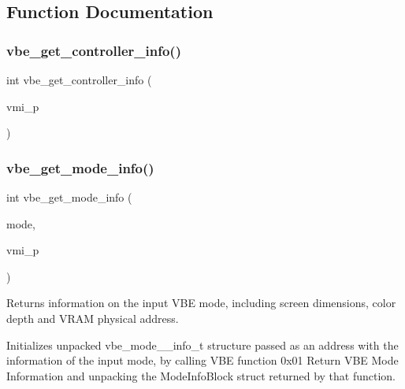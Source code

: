 \subsection{Function Documentation}
\mbox{\label{group__vbe_ga18c7989ffdce07149a4f948798afeca5}} 
\subsubsection{\texorpdfstring{vbe\+\_\+get\+\_\+controller\+\_\+info()}{vbe\_get\_controller\_info()}}
{\footnotesize\ttfamily int vbe\+\_\+get\+\_\+controller\+\_\+info (\begin{DoxyParamCaption}\item[{vbe\+\_\+controller\+\_\+info\+\_\+t $\ast$}]{vmi\+\_\+p }\end{DoxyParamCaption})}

\mbox{\label{group__vbe_ga4ef3234e41f2050bc094a22049b69e45}} 
\subsubsection{\texorpdfstring{vbe\+\_\+get\+\_\+mode\+\_\+info()}{vbe\_get\_mode\_info()}}
{\footnotesize\ttfamily int vbe\+\_\+get\+\_\+mode\+\_\+info (\begin{DoxyParamCaption}\item[{unsigned short}]{mode,  }\item[{vbe\+\_\+mode\+\_\+info\+\_\+t $\ast$}]{vmi\+\_\+p }\end{DoxyParamCaption})}



Returns information on the input V\+BE mode, including screen dimensions, color depth and V\+R\+AM physical address. 

Initializes unpacked vbe\+\_\+mode\+\_\+\+\_\+info\+\_\+t structure passed as an address with the information of the input mode, by calling V\+BE function 0x01 Return V\+BE Mode Information and unpacking the Mode\+Info\+Block struct returned by that function.



